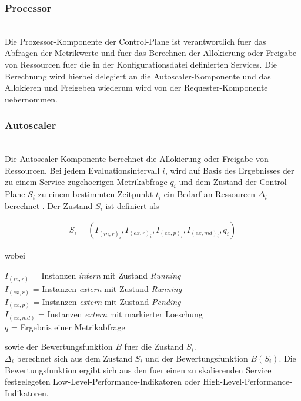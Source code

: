\documentclass[runningheads]{llncs}
\begin{document}
\subsubsection{Processor} \hfill\\

Die Prozessor-Komponente der Control-Plane ist verantwortlich fuer das Abfragen der Metrikwerte und fuer das Berechnen der Allokierung oder Freigabe von Ressourcen fuer die in der Konfigurationsdatei definierten Services. Die Berechnung wird hierbei delegiert an die Autoscaler-Komponente und das Allokieren und Freigeben wiederum wird von der Requester-Komponente uebernommen.
	
\subsubsection{Autoscaler} \hfill\\

Die Autoscaler-Komponente berechnet die Allokierung oder Freigabe von Ressourcen. Bei jedem Evaluationsintervall $i$, wird auf Basis des Ergebnisses der zu einem Service zugehoerigen Metrikabfrage $q_{i}$ und dem Zustand der Control-Plane $S_{i}$ zu einem bestimmten Zeitpunkt $t_{i}$ ein Bedarf an Ressourcen $\Delta _{i}$ berechnet . Der Zustand $S_{i}$ ist definiert als

\begin{gather*}
	S_{i}=\left( I_{(in,r)_{i}}, I_{(ex,r)_{i}}, I_{(ex,p)_{i}},  I_{(ex,md)_{i}} , q_{i} \right)
\end{gather*}

wobei

	$I_{(in,r)}$ = Instanzen \textit{intern} mit Zustand \textit{Running} \\
	$I_{(ex,r)}$ = Instanzen \textit{extern} mit Zustand \textit{Running} \\
	$I_{(ex,p)}$ = Instanzen \textit{extern} mit Zustand \textit{Pending} \\
	$I_{(ex,md)}$ = Instanzen \textit{extern} mit markierter Loeschung \\
	$q$ = Ergebnis einer Metrikabfrage
	
sowie der Bewertungsfunktion  $B$ fuer die Zustand $S_{i}$. \\

$\Delta _{i}$ berechnet sich aus dem Zustand $S_{i}$ und der Bewertungsfunktion $B(S_{i})$. Die Bewertungsfunktion ergibt sich aus den fuer einen zu skalierenden Service festgelegeten Low-Level-Performance-Indikatoren oder High-Level-Performance-Indikatoren. \\
\end{document}
